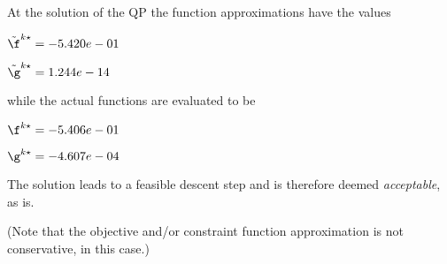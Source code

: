 At the solution of the QP the function approximations have the values

$\tilde \f^{k\star} = -5.420e-01$

$\tilde \g^{k\star} =  1.244e-14$

\bigskip
while the actual functions are evaluated to be

$\f^{k\star} = -5.406e-01$

$\g^{k\star} = -4.607e-04$

\bigskip
 The solution leads to a feasible descent step and                     is therefore deemed \emph{acceptable}, as is. 
 
(Note that the objective and/or constraint function approximation                         is not conservative, in this case.)
